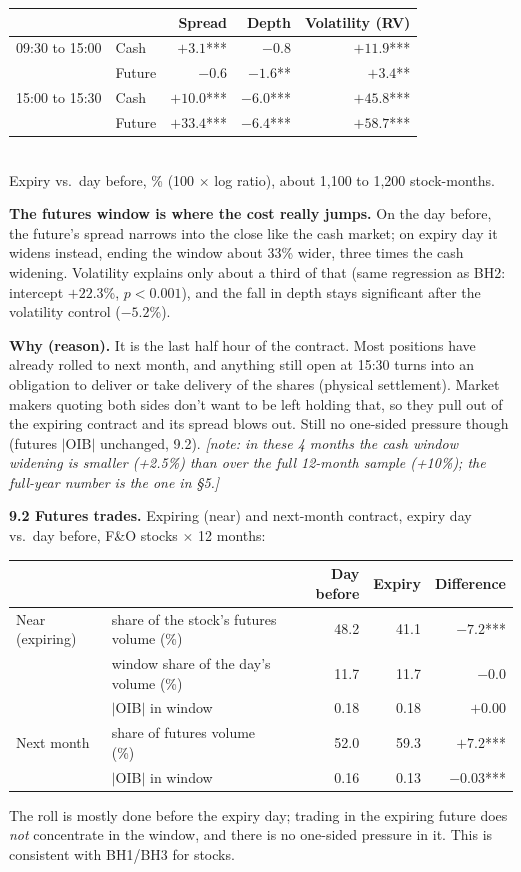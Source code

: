 \documentclass[11pt]{article}
\newcommand{\note}[1]{\textit{\small[note: #1]}}
\begin{document}
\begin{center}
\small
\begin{tabular}{llrrr}
\toprule
 & & Spread & Depth & Volatility (RV) \\
\midrule
09:30 to 15:00 & Cash & $+3.1$*** & $-0.8$ & $+11.9$*** \\
               & Future & $-0.6$ & $-1.6$** & $+3.4$** \\
15:00 to 15:30 & Cash & $+10.0$*** & $-6.0$*** & $+45.8$*** \\
               & Future & $\mathbf{+33.4}$*** & $-6.4$*** & $+58.7$*** \\
\bottomrule
\end{tabular}\\
Expiry vs.\ day before, \% (100 $\times$ log ratio), about 1,100 to 1,200 stock-months.
\end{center}

\textbf{The futures window is where the cost really jumps.} On the day before, the future's
spread narrows into the close like the cash market; on expiry day it widens instead, ending the
window about 33\% wider, three times the cash widening. Volatility explains only about a third
of that (same regression as BH2: intercept $+22.3$\%, $p<0.001$), and the fall in depth stays
significant after the volatility control ($-5.2$\%).

\textbf{Why (reason).} It is the last half hour of the contract. Most positions have already
rolled to next month, and anything still open at 15:30 turns into an obligation to deliver or
take delivery of the shares (physical settlement). Market makers quoting both sides don't want
to be left holding that, so they pull out of the expiring contract and its spread blows out.
Still no one-sided pressure though (futures $|$OIB$|$ unchanged, 9.2).
\note{in these 4 months the cash window widening is smaller (+2.5\%) than over the full
12-month sample (+10\%); the full-year number is the one in \S5.}

\textbf{9.2 Futures trades.} Expiring (near) and next-month contract, expiry day vs.\ day
before, F\&O stocks $\times$ 12 months:
\begin{center}
\small
\begin{tabular}{llrrr}
\toprule
 & & Day before & Expiry & Difference \\
\midrule
Near (expiring) & share of the stock's futures volume (\%) & 48.2 & 41.1 & $-7.2$*** \\
                & window share of the day's volume (\%) & 11.7 & 11.7 & $-0.0$ \\
                & $|$OIB$|$ in window & 0.18 & 0.18 & $+0.00$ \\
Next month      & share of futures volume (\%) & 52.0 & 59.3 & $+7.2$*** \\
                & $|$OIB$|$ in window & 0.16 & 0.13 & $-0.03$*** \\
\bottomrule
\end{tabular}
\end{center}
The roll is mostly done before the expiry day; trading in the expiring future does
\emph{not} concentrate in the window, and there is no one-sided pressure in it. This is
consistent with BH1/BH3 for stocks.
\end{document}
